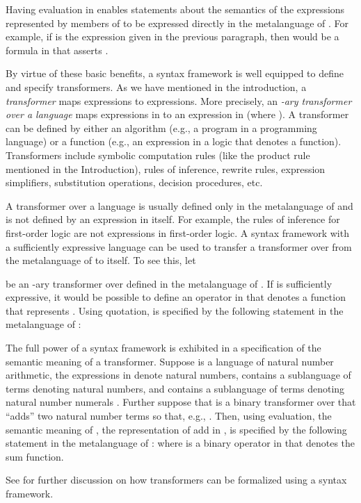 \documentclass[11pt,fleqn]{article}
\newcommand{\mname}[1]{\mbox{\sf #1}}
\begin{document}
Having evaluation in  enables statements about the semantics of the
expressions represented by members of  to be expressed
directly in the metalanguage of .  For example, if  is the
expression given in the previous paragraph, then  would be a
formula in  that asserts .

By virtue of these basic benefits, a syntax framework is well equipped
to define and specify transformers.  As we have mentioned in the
introduction, a \emph{transformer} maps expressions to expressions.
More precisely, an \emph{-ary transformer over a language } maps
expressions  in  to an expression  in  (where
).  A transformer can be defined by either an algorithm
(e.g., a program in a programming language) or a function (e.g., an
expression in a logic that denotes a function).  Transformers include
symbolic computation rules (like the product rule mentioned in the
Introduction), rules of inference, rewrite rules, expression
simplifiers, substitution operations, decision procedures, etc.

A transformer over a language  is usually defined only in the
metalanguage of  and is not defined by an expression in  itself.
For example, the rules of inference for first-order logic are not
expressions in first-order logic.  A syntax framework with a
sufficiently expressive language can be used to transfer a transformer
over  from the metalanguage of  to  itself.  To see this, let

be an -ary transformer over  defined in the
metalanguage of .  If  is sufficiently expressive, it would be
possible to define an operator  in  that denotes a function  that
represents .  Using quotation,  is specified by the following
statement in the metalanguage of : 

The full power of a syntax framework is exhibited in a specification
of the semantic meaning of a transformer.  Suppose  is a language
of natural number arithmetic, the expressions in  denote
natural numbers,  contains a sublanguage  of
terms denoting natural numbers, and  contains a
sublanguage  of terms denoting natural number numerals
.  Further suppose that  is a
binary transformer over  that ``adds'' two natural number
terms so that, e.g., .  Then, using evaluation,
the semantic meaning of , the representation of
\mname{add} in , is specified by the following statement in the
metalanguage of :
 where  is a binary operator in  that denotes the sum
function.

See \cite{Farmer13} for further discussion on how transformers can be
formalized using a syntax framework.
\end{document}
